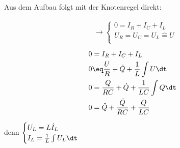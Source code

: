\documentclass[11pt]{article}
\begin{document}
\subsection{}
\begin{adjustwidth}{20pt}{}
    Aus dem Aufbau folgt mit der Knotenregel direkt:
\end{adjustwidth}
\begin{align*}
    &\rightarrow \begin{cases}
        0 = I_R + I_C + I_L\\
        U_R=U_C=U_L \hat = U\\
    \end{cases}
\end{align*}
\begin{align*}
    0 &= I_R + I_C + I_L\\
    0 &\eq \frac{U}{R} + \dot Q + \frac 1L \int U\dt \\
    0 &= \frac{Q}{R C} + \dot Q  + \frac 1{LC} \int Q\dt \\
    0 &= \ddot Q + \frac{\dot Q}{R C} + \frac Q{LC} \\
\end{align*}
\begin{adjustwidth}{20pt}{}
    \con denn \(\begin{cases}
        U_L = L \dot I_L\\
        I_L = \frac 1L \int U_L\dt\\
    \end{cases}\)
\end{adjustwidth}
\end{document}

